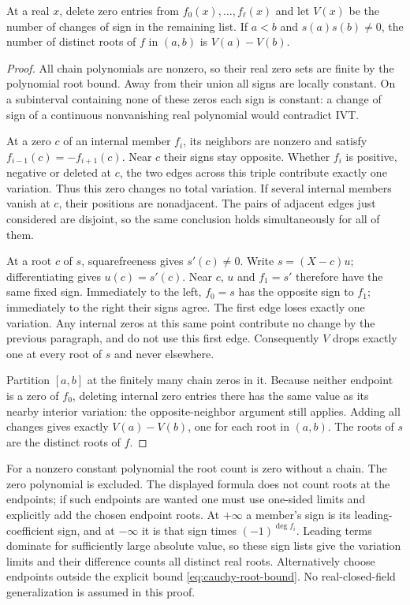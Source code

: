 \begin{theorem}\label{thm:sturm}
At a real $x$, delete zero entries from
$f_0(x),\ldots,f_\ell(x)$ and let $V(x)$ be the number of
changes of sign in the remaining list. If $a<b$ and
$s(a)s(b)\ne0$, the number of distinct roots of $f$ in $(a,b)$ is
$V(a)-V(b)$.
\end{theorem}
\begin{proof}
All chain polynomials are nonzero, so their real zero sets are
finite by the polynomial root bound. Away from their union all
signs are locally constant. On a subinterval containing none
of these zeros each sign is constant: a change of sign of a
continuous nonvanishing real polynomial would contradict IVT.

At a zero $c$ of an internal member $f_i$, its neighbors are
nonzero and satisfy $f_{i-1}(c)=-f_{i+1}(c)$.
Near $c$ their signs stay opposite. Whether $f_i$ is positive,
negative or deleted at $c$, the two edges across this triple
contribute exactly one variation. Thus this zero changes no
total variation. If several internal members vanish at $c$,
their positions are nonadjacent. The pairs of adjacent edges
just considered are disjoint, so the same conclusion holds
simultaneously for all of them.

At a root $c$ of $s$, squarefreeness gives $s'(c)\ne0$.
Write $s=(X-c)u$; differentiating gives $u(c)=s'(c)$.
Near $c$, $u$ and $f_1=s'$ therefore have the same fixed sign.
Immediately to the left, $f_0=s$ has the opposite sign to
$f_1$; immediately to the right their signs agree.
The first edge loses exactly one variation. Any internal
zeros at this same point contribute no change by the previous
paragraph, and do not use this first edge.
Consequently $V$ drops exactly one at every root of $s$ and
never elsewhere.

Partition $[a,b]$ at the finitely many chain zeros in it.
Because neither endpoint is a zero of $f_0$, deleting internal
zero entries there has the same value as its nearby interior
variation: the opposite-neighbor argument still applies.
Adding all changes gives exactly $V(a)-V(b)$, one for each
root in $(a,b)$. The roots of $s$ are the distinct roots of $f$.
\end{proof}
For a nonzero constant polynomial the root count is zero without
a chain. The zero polynomial is excluded. The displayed formula
does not count roots at the endpoints; if such endpoints are
wanted one must use one-sided limits and explicitly add the
chosen endpoint roots. At $+\infty$ a member's sign is its
leading-coefficient sign, and at $-\infty$ it is that sign
times $(-1)^{\deg f_i}$. Leading terms dominate for sufficiently
large absolute value, so these sign lists give the variation
limits and their difference counts all distinct real roots.
Alternatively choose endpoints outside the explicit bound
\eqref{eq:cauchy-root-bound}. No real-closed-field generalization
is assumed in this proof.

